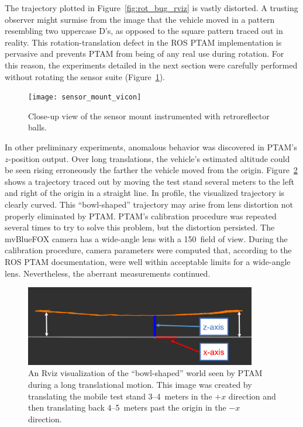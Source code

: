 The trajectory plotted in Figure~\ref{fig:rot_bug_rviz} is vastly distorted. A trusting observer might surmise from the image that the vehicle moved in a pattern resembling two uppercase D's, as opposed to the square pattern traced out in reality. This rotation-translation defect in the ROS PTAM implementation is pervasive and prevents PTAM from being of any real use during rotation. For this reason, the experiments detailed in the next section were carefully performed without rotating the sensor suite (Figure~\ref{fig:sensor_mount_vicon}).

\begin{figure}
  \centering
    \texttt{[image: sensor\_mount\_vicon]}
  \caption[Sensor Mount Instrumented with Retroreflectors]{Close-up view of the sensor mount instrumented with retroreflector balls.}
  \label{fig:sensor_mount_vicon}
\end{figure}

In other preliminary experiments, anomalous behavior was discovered in PTAM's $z$-position output. Over long translations, the vehicle's estimated altitude could be seen rising erroneously the farther the vehicle moved from the origin. Figure~\ref{fig:bowl-shaped_world} shows a trajectory traced out by moving the test stand several meters to the left and right of the origin in a straight line. In profile, the visualized trajectory is clearly curved. This ``bowl-shaped'' trajectory may arise from lens distortion not properly eliminated by PTAM. PTAM's calibration procedure was repeated several times to try to solve this problem, but the distortion persisted. The mvBlueFOX camera has a wide-angle lens with a 150\textdegree\ field of view. During the calibration procedure, camera parameters were computed that, according to the ROS PTAM documentation, were well within acceptable limits for a wide-angle lens. Nevertheless, the aberrant measurements continued.

\begin{figure}
  \centering
    \includegraphics[width=0.9\textwidth]{bowl-shaped_world}
  \caption[Rviz Visualization of Translational (Lens) Distortion]{An Rviz visualization of the ``bowl-shaped'' world seen by PTAM during a long translational motion. This image was created by translating the mobile test stand 3--4~meters in the $+x$ direction and then translating back 4--5~meters past the origin in the $-x$ direction.}
  \label{fig:bowl-shaped_world}
\end{figure}

